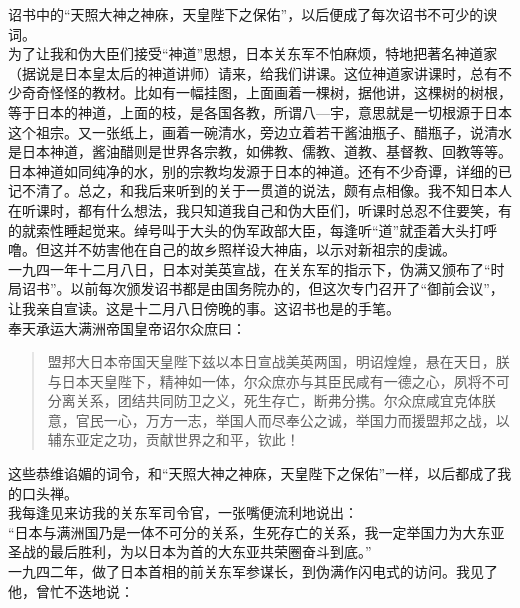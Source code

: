 诏书中的“天照大神之神庥，天皇陛下之保佑”，以后便成了每次诏书不可少的谀词。\\

为了让我和伪大臣们接受“神道”思想，日本关东军不怕麻烦，特地把著名神道家（据说是日本皇太后的神道讲师）请来，给我们讲课。这位神道家讲课时，总有不少奇奇怪怪的教材。比如有一幅挂图，上面画着一棵树，据他讲，这棵树的树根，等于日本的神道，上面的枝，是各国各教，所谓八—宇，意思就是一切根源于日本这个祖宗。又一张纸上，画着一碗清水，旁边立着若干酱油瓶子、醋瓶子，说清水是日本神道，酱油醋则是世界各宗教，如佛教、儒教、道教、基督教、回教等等。日本神道如同纯净的水，别的宗教均发源于日本的神道。还有不少奇谭，详细的已记不清了。总之，和我后来听到的关于一贯道的说法，颇有点相像。我不知日本人在听课时，都有什么想法，我只知道我自己和伪大臣们，听课时总忍不住要笑，有的就索性睡起觉来。绰号叫于大头的伪军政部大臣，每逢听“道”就歪着大头打呼噜。但这并不妨害他在自己的故乡照样设大神庙，以示对新祖宗的虔诚。\\

一九四一年十二月八日，日本对美英宣战，在关东军的指示下，伪满又颁布了“时局诏书”。以前每次颁发诏书都是由国务院办的，但这次专门召开了“御前会议”，让我亲自宣读。这是十二月八日傍晚的事。这诏书也是的手笔。\\

奉天承运大满洲帝国皇帝诏尔众庶曰：\\

\begin{quote}
	盟邦大日本帝国天皇陛下兹以本日宣战美英两国，明诏煌煌，悬在天日，朕与日本天皇陛下，精神如一体，尔众庶亦与其臣民咸有一德之心，夙将不可分离关系，团结共同防卫之义，死生存亡，断弗分携。尔众庶咸宜克体朕意，官民一心，万方一志，举国人而尽奉公之诚，举国力而援盟邦之战，以辅东亚定之功，贡献世界之和平，钦此！
\end{quote}

这些恭维谄媚的词令，和“天照大神之神庥，天皇陛下之保佑”一样，以后都成了我的口头禅。\\

我每逢见来访我的关东军司令官，一张嘴便流利地说出：\\

“日本与满洲国乃是一体不可分的关系，生死存亡的关系，我一定举国力为大东亚圣战的最后胜利，为以日本为首的大东亚共荣圈奋斗到底。”\\

一九四二年，做了日本首相的前关东军参谋长，到伪满作闪电式的访问。我见了他，曾忙不迭地说：\\

